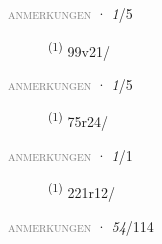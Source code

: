 \textsc{\textcolor{gray}{anmerkungen}}
\ENTRYEND
\noindent{} · \textit{1}/5 \LEMMALINE
\begin{description}
    \item[]  \textsuperscript{(1)} \mbox{99v21/}
\end{description}
\textsc{\textcolor{gray}{anmerkungen}}
\ENTRYEND
\noindent{} · \textit{1}/5 \LEMMALINE
\begin{description}
    \item[]  \textsuperscript{(1)} \mbox{75r24/}
\end{description}
\textsc{\textcolor{gray}{anmerkungen}}
\ENTRYEND
\noindent{} · \textit{1}/1 \LEMMALINE
\begin{description}
    \item[]  \textsuperscript{(1)} \mbox{221r12/}
\end{description}
\textsc{\textcolor{gray}{anmerkungen}}
\ENTRYEND
\noindent{} · \textit{54}/114 \LEMMALINE
